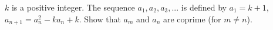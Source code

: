 $k$ is a positive integer. The sequence $a_1, a_2, a_3, ...$ is defined by $a_1 = k+1$, $a_{n+1} = a_n ^2 - ka_n + k$. Show that $a_m$ and $a_n$ are coprime (for $m \not = n$).